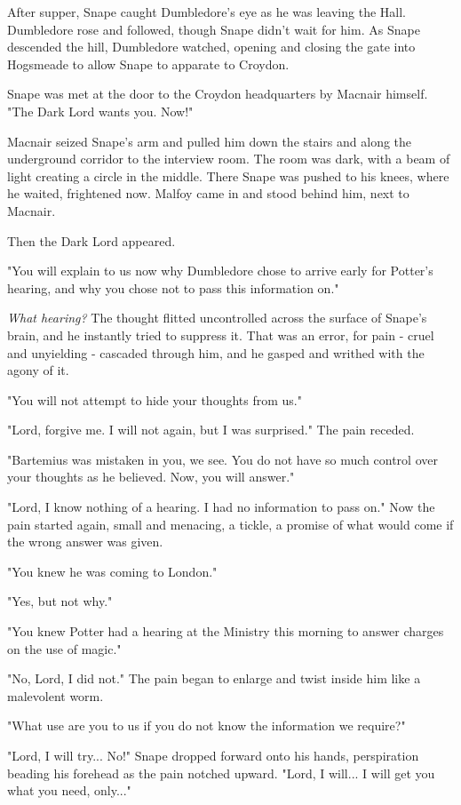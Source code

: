 \documentclass[a4paper,11pt]{article}
\begin{document}
After supper, Snape caught Dumbledore's eye as he was leaving the Hall. Dumbledore rose and followed, though Snape didn't wait for him. As Snape descended the hill, Dumbledore watched, opening and closing the gate into Hogsmeade to allow Snape to apparate to Croydon.

Snape was met at the door to the Croydon headquarters by Macnair himself. "The Dark Lord wants you. Now!"

Macnair seized Snape's arm and pulled him down the stairs and along the underground corridor to the interview room. The room was dark, with a beam of light creating a circle in the middle. There Snape was pushed to his knees, where he waited, frightened now. Malfoy came in and stood behind him, next to Macnair.

Then the Dark Lord appeared.

"You will explain to us now why Dumbledore chose to arrive early for Potter's hearing, and why you chose not to pass this information on."

\emph{What hearing?} The thought flitted uncontrolled across the surface of Snape's brain, and he instantly tried to suppress it. That was an error, for pain - cruel and unyielding - cascaded through him, and he gasped and writhed with the agony of it.

"You will not attempt to hide your thoughts from us."

"Lord, forgive me. I will not again, but I was surprised." The pain receded.

"Bartemius was mistaken in you, we see. You do not have so much control over your thoughts as he believed. Now, you will answer."

"Lord, I know nothing of a hearing. I had no information to pass on." Now the pain started again, small and menacing, a tickle, a promise of what would come if the wrong answer was given.

"You knew he was coming to London."

"Yes, but not why."

"You knew Potter had a hearing at the Ministry this morning to answer charges on the use of magic."

"No, Lord, I did not." The pain began to enlarge and twist inside him like a malevolent worm.

"What use are you to us if you do not know the information we require?"

"Lord, I will try... No!" Snape dropped forward onto his hands, perspiration beading his forehead as the pain notched upward. "Lord, I will... I will get you what you need, only..."
\end{document}
